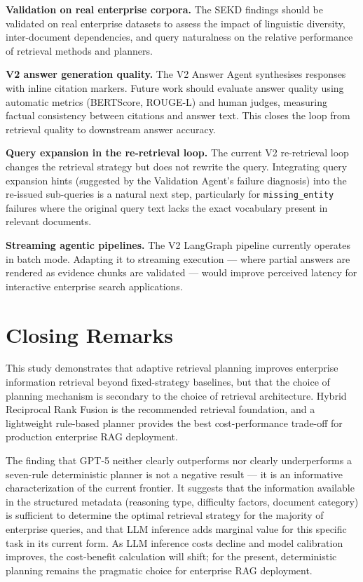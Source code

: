 \textbf{Validation on real enterprise corpora.} The SEKD findings should be validated on real enterprise datasets to assess the impact of linguistic diversity, inter-document dependencies, and query naturalness on the relative performance of retrieval methods and planners.

\textbf{V2 answer generation quality.} The V2 Answer Agent synthesises responses with inline citation markers. Future work should evaluate answer quality using automatic metrics (BERTScore, ROUGE-L) and human judges, measuring factual consistency between citations and answer text. This closes the loop from retrieval quality to downstream answer accuracy.

\textbf{Query expansion in the re-retrieval loop.} The current V2 re-retrieval loop changes the retrieval strategy but does not rewrite the query. Integrating query expansion hints (suggested by the Validation Agent's failure diagnosis) into the re-issued sub-queries is a natural next step, particularly for \texttt{missing\_entity} failures where the original query text lacks the exact vocabulary present in relevant documents.

\textbf{Streaming agentic pipelines.} The V2 LangGraph pipeline currently operates in batch mode. Adapting it to streaming execution --- where partial answers are rendered as evidence chunks are validated --- would improve perceived latency for interactive enterprise search applications.

\section{Closing Remarks}
\label{sec:conc_closing}

This study demonstrates that adaptive retrieval planning improves enterprise information retrieval beyond fixed-strategy baselines, but that the choice of planning mechanism is secondary to the choice of retrieval architecture. Hybrid Reciprocal Rank Fusion is the recommended retrieval foundation, and a lightweight rule-based planner provides the best cost-performance trade-off for production enterprise RAG deployment.

The finding that GPT-5 neither clearly outperforms nor clearly underperforms a seven-rule deterministic planner is not a negative result --- it is an informative characterization of the current frontier. It suggests that the information available in the structured metadata (reasoning type, difficulty factors, document category) is sufficient to determine the optimal retrieval strategy for the majority of enterprise queries, and that LLM inference adds marginal value for this specific task in its current form. As LLM inference costs decline and model calibration improves, the cost-benefit calculation will shift; for the present, deterministic planning remains the pragmatic choice for enterprise RAG deployment.
